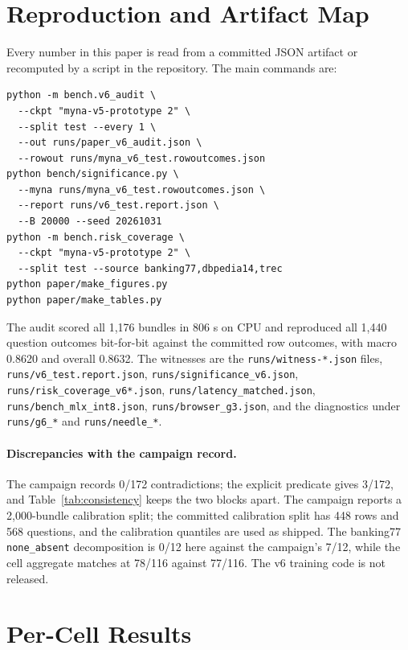 \appendix

\section{Reproduction and Artifact Map}
\label{app:extra}

Every number in this paper is read from a committed JSON artifact or recomputed by a script in the repository. The main commands are:

{\scriptsize
\begin{verbatim}
python -m bench.v6_audit \
  --ckpt "myna-v5-prototype 2" \
  --split test --every 1 \
  --out runs/paper_v6_audit.json \
  --rowout runs/myna_v6_test.rowoutcomes.json
python bench/significance.py \
  --myna runs/myna_v6_test.rowoutcomes.json \
  --report runs/v6_test.report.json \
  --B 20000 --seed 20261031
python -m bench.risk_coverage \
  --ckpt "myna-v5-prototype 2" \
  --split test --source banking77,dbpedia14,trec
python paper/make_figures.py
python paper/make_tables.py
\end{verbatim}
}

The audit scored all 1{,}176 bundles in 806 s on CPU and reproduced all 1{,}440 question outcomes bit-for-bit against the committed row outcomes, with macro 0.8620 and overall 0.8632. The witnesses are the \texttt{runs/witness-*.json} files, \texttt{runs/v6\_test.report.json}, \texttt{runs/significance\_v6.json}, \texttt{runs/risk\_coverage\_v6*.json}, \texttt{runs/latency\_matched.json}, \texttt{runs/bench\_mlx\_int8.json}, \texttt{runs/browser\_g3.json}, and the diagnostics under \texttt{runs/g6\_*} and \texttt{runs/needle\_*}.

\paragraph{Discrepancies with the campaign record.}
The campaign records 0/172 contradictions; the explicit predicate gives 3/172, and Table~\ref{tab:consistency} keeps the two blocks apart. The campaign reports a 2{,}000-bundle calibration split; the committed calibration split has 448 rows and 568 questions, and the calibration quantiles are used as shipped. The banking77 \texttt{none\_absent} decomposition is 0/12 here against the campaign's 7/12, while the cell aggregate matches at 78/116 against 77/116. The v6 training code is not released.

\section{Per-Cell Results}
\label{app:cells}

